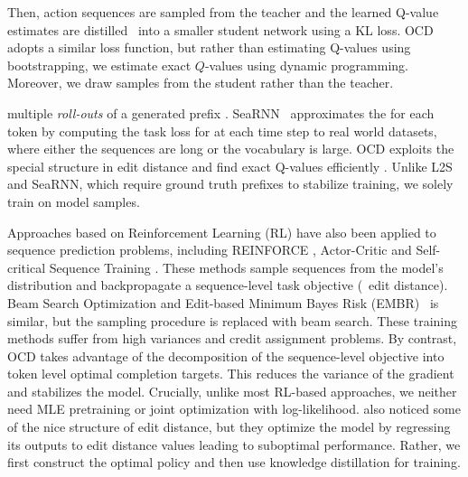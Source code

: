 Then, action sequences are sampled from
the teacher and the learned Q-value estimates are distilled~\citep{hinton-nips-2014} into a
smaller student network using a KL loss. OCD adopts a similar loss function,
but rather than estimating Q-values using bootstrapping,
we estimate exact $Q$-values using dynamic programming. Moreover, we draw
samples from the student rather than the teacher.
 
multiple {\em roll-outs} of a generated
prefix . SeaRNN~\citep{searnn2017} approximates the  for
each token by computing the task loss for 
at each time step  to real world
datasets, where either the sequences are long or the
vocabulary is large. %
OCD exploits the special structure in edit distance
and find exact Q-values efficiently . Unlike L2S and SeaRNN, which require
ground truth prefixes to stabilize training, we solely train on model samples.

Approaches based on Reinforcement Learning (RL) have also been applied to sequence prediction problems,
including REINFORCE \citep{ranzato-iclr-2016}, Actor-Critic \citep{bahdanau-iclr-2017} and Self-critical Sequence Training \citep{rennie-cvpr-2017}.
These methods sample sequences from the model's distribution and backpropagate a sequence-level task objective (\eg~edit distance).
Beam Search Optimization \citep{wiseman-emnlp-2016} and Edit-based Minimum Bayes Risk (EMBR)~\citep{prabhavalkar-icassp-2018} is similar,
but the sampling procedure is replaced with beam search.
These training methods suffer from high variances and credit assignment problems.
By contrast, OCD takes advantage of the decomposition of the sequence-level objective into token level optimal completion targets.
This reduces the variance of the gradient and stabilizes the model.
Crucially, unlike most RL-based approaches, we neither need MLE pretraining or joint optimization with log-likelihood.
\cite{bahdanau-iclr-2016} also noticed some of the nice structure of edit distance, but they optimize the model
by regressing its outputs to edit distance values leading to suboptimal performance. Rather, we first construct the optimal policy and then use knowledge distillation for training. 


